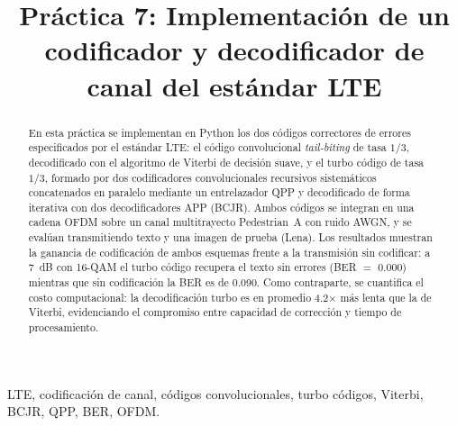 \documentclass[conference,onecolumn]{IEEEtran}
\begin{document}
\title{Práctica 7: Implementación de un codificador y decodificador de canal del estándar LTE}

\author{
\and
{}
}

\maketitle

\begin{abstract}
En esta práctica se implementan en Python los dos códigos correctores de errores especificados
por el estándar LTE: el código convolucional \textit{tail-biting} de tasa $1/3$, decodificado con el
algoritmo de Viterbi de decisión suave, y el turbo código de tasa $1/3$, formado por dos
codificadores convolucionales recursivos sistemáticos concatenados en paralelo mediante un
entrelazador QPP y decodificado de forma iterativa con dos decodificadores APP (BCJR).
Ambos códigos se integran en una cadena OFDM sobre un canal multitrayecto Pedestrian~A con ruido
AWGN, y se evalúan transmitiendo texto y una imagen de prueba (Lena). Los resultados muestran la
ganancia de codificación de ambos esquemas frente a la transmisión sin codificar: a
7~dB con 16-QAM el turbo código recupera el texto sin errores
(BER $=$ 0.000) mientras que sin codificación la BER es de 0.090.
Como contraparte, se cuantifica el costo computacional: la decodificación turbo es en promedio
4.2$\times$ más lenta que la de Viterbi, evidenciando el compromiso entre capacidad de
corrección y tiempo de procesamiento.
\end{abstract}

\begin{IEEEkeywords}
LTE, codificación de canal, códigos convolucionales, turbo códigos, Viterbi, BCJR, QPP, BER, OFDM.
\end{IEEEkeywords}

\IEEEpeerreviewmaketitle
\end{document}
